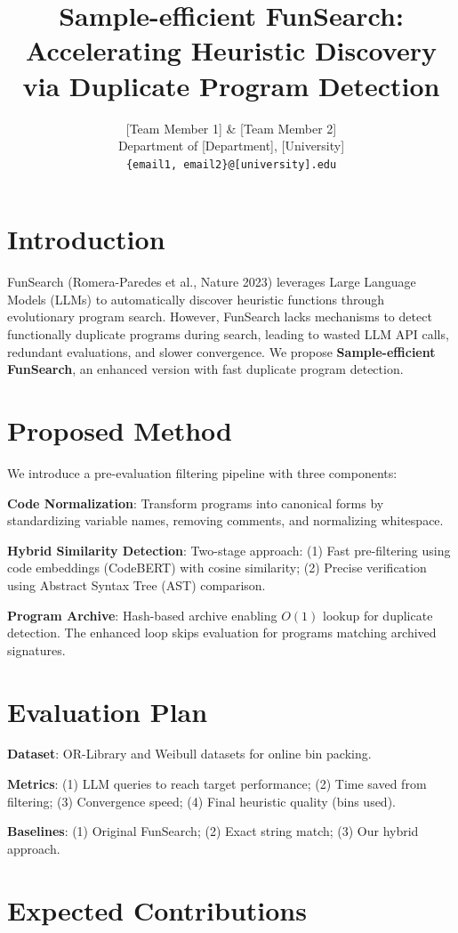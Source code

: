 \documentclass{article} %
\title{Sample-efficient FunSearch: Accelerating Heuristic Discovery via Duplicate Program Detection}
\author{[Team Member 1] \& [Team Member 2] \\
Department of [Department], [University] \\
\texttt{\{email1, email2\}@[university].edu} \\
}
\begin{document}
\maketitle

\section{Introduction}

FunSearch (Romera-Paredes et al., Nature 2023) leverages Large Language Models (LLMs) to automatically discover heuristic functions through evolutionary program search. However, FunSearch lacks mechanisms to detect functionally duplicate programs during search, leading to wasted LLM API calls, redundant evaluations, and slower convergence. We propose \textbf{Sample-efficient FunSearch}, an enhanced version with fast duplicate program detection.

\section{Proposed Method}

We introduce a pre-evaluation filtering pipeline with three components:

\textbf{Code Normalization}: Transform programs into canonical forms by standardizing variable names, removing comments, and normalizing whitespace.

\textbf{Hybrid Similarity Detection}: Two-stage approach: (1) Fast pre-filtering using code embeddings (CodeBERT) with cosine similarity; (2) Precise verification using Abstract Syntax Tree (AST) comparison.

\textbf{Program Archive}: Hash-based archive enabling $O(1)$ lookup for duplicate detection. The enhanced loop skips evaluation for programs matching archived signatures.

\section{Evaluation Plan}

\textbf{Dataset}: OR-Library and Weibull datasets for online bin packing.

\textbf{Metrics}: (1) LLM queries to reach target performance; (2) Time saved from filtering; (3) Convergence speed; (4) Final heuristic quality (bins used).

\textbf{Baselines}: (1) Original FunSearch; (2) Exact string match; (3) Our hybrid approach.

\section{Expected Contributions}
\end{document}
